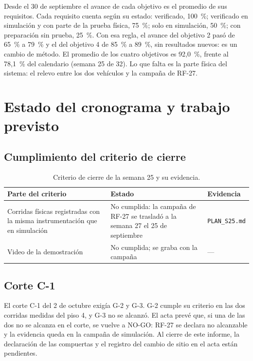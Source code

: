 \documentclass[12pt,letterpaper]{article}
\begin{document}
Desde el 30 de septiembre el avance de cada objetivo es el promedio de sus requisitos. Cada requisito cuenta según su estado: verificado, 100~\%; verificado en simulación y con parte de la prueba física, 75~\%; solo en simulación, 50~\%; con preparación sin prueba, 25~\%. Con esa regla, el avance del objetivo 2 pasó de 65~\% a 79~\% y el del objetivo 4 de 85~\% a 89~\%, sin resultados nuevos: es un cambio de método. El promedio de los cuatro objetivos es 92,0~\%, frente al 78,1~\% del calendario (semana 25 de 32). Lo que falta es la parte física del sistema: el relevo entre los dos vehículos y la campaña de RF-27.

\section{Estado del cronograma y trabajo previsto}
\label{sec:cronograma}

\subsection{Cumplimiento del criterio de cierre}

\begin{table}[H]
    \centering
    \small
    \caption{Criterio de cierre de la semana 25 y su evidencia.}
    \label{tab:cierre}
    \begin{tabular}{@{}p{5.4cm}p{6.0cm}p{2.6cm}@{}}
        \toprule
        \textbf{Parte del criterio} & \textbf{Estado} & \textbf{Evidencia} \\ \midrule
        Corridas físicas registradas con la misma instrumentación que en simulación & No cumplida: la campaña de RF-27 se trasladó a la semana 27 el 25 de septiembre & \texttt{PLAN\_S25.md} \\ \addlinespace
        Video de la demostración & No cumplida; se graba con la campaña & --- \\ \bottomrule
    \end{tabular}
\end{table}

\subsection{Corte C-1}

El corte C-1 del 2 de octubre exigía G-2 y G-3. G-2 cumple su criterio en las dos corridas medidas del piso 4, y G-3 no se alcanzó. El acta prevé que, si una de las dos no se alcanza en el corte, se vuelve a NO-GO: RF-27 se declara no alcanzable y la evidencia queda en la campaña de simulación. Al cierre de este informe, la declaración de las compuertas y el registro del cambio de sitio en el acta están pendientes.
\end{document}
